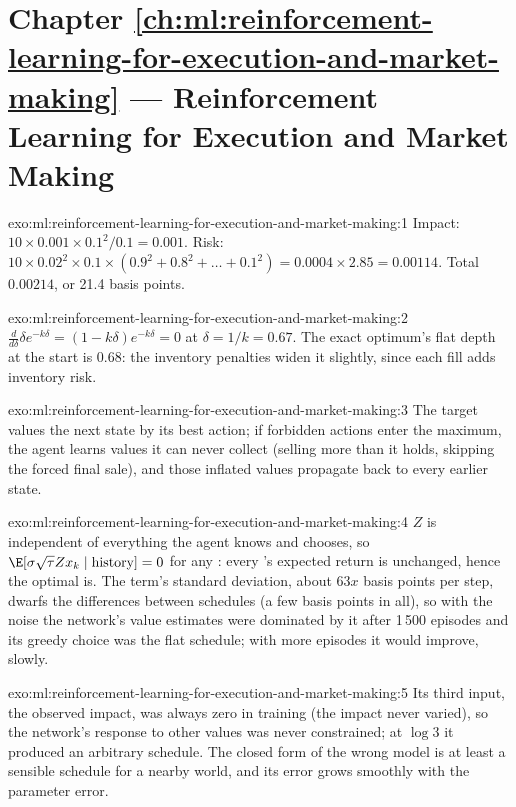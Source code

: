 \section*{Chapter \ref{ch:ml:reinforcement-learning-for-execution-and-market-making} --- Reinforcement Learning for Execution and Market Making}

\begin{solution}{exo:ml:reinforcement-learning-for-execution-and-market-making:1}
Impact: $10\times0.001\times0.1^2/0.1 = 0.001$. Risk: $10\times0.02^2\times0.1\times(0.9^2 + 0.8^2 + \dots + 0.1^2) =
0.0004\times2.85 = 0.00114$. Total $0.00214$, or 21.4 basis points.
\end{solution}

\begin{solution}{exo:ml:reinforcement-learning-for-execution-and-market-making:2}
$\frac{d}{d\delta}\delta e^{-k\delta} = (1 - k\delta)e^{-k\delta} = 0$ at $\delta = 1/k = 0.67$. The exact optimum's flat
depth at the start is 0.68: the inventory penalties widen it slightly, since each fill adds inventory risk.
\end{solution}

\begin{solution}{exo:ml:reinforcement-learning-for-execution-and-market-making:3}
The target values the next state by its best action; if forbidden actions enter the maximum, the agent learns values it can
never collect (selling more than it holds, skipping the forced final sale), and those inflated values propagate back to
every earlier state.
\end{solution}

\begin{solution}{exo:ml:reinforcement-learning-for-execution-and-market-making:4}
$Z$ is independent of everything the agent knows and chooses, so $\E[\sigma\sqrt\tau Zx_k\mid\text{history}] = 0$ for any
: every 's expected return is unchanged, hence the optimal  is. The term's standard deviation, about
$63x$ basis points per step, dwarfs the differences between schedules (a few basis points in all), so with the noise the
network's value estimates were dominated by it after 1\,500 episodes and its greedy choice was the flat schedule; with more
episodes it would improve, slowly.
\end{solution}

\begin{solution}{exo:ml:reinforcement-learning-for-execution-and-market-making:5}
Its third input, the observed impact, was always zero in training (the impact never varied), so the network's response to
other values was never constrained; at $\log3$ it produced an arbitrary schedule. The closed form of the wrong model is at
least a sensible schedule for a nearby world, and its error grows smoothly with the parameter error.
\end{solution}

